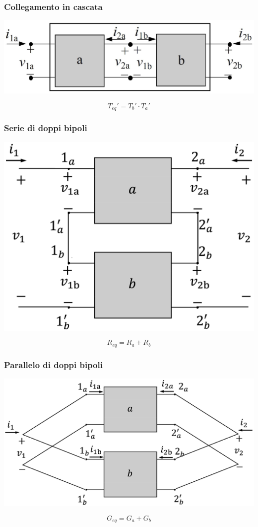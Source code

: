 \documentclass[a4paper]{article}
\begin{document}
\begin{multicols}{2}
	\subsubsection*{Collegamento in cascata}
	\begin{center}
		\includegraphics[width=0.8\linewidth]{immagini/dbp_cascata.png}
	\end{center}
	\[T_{eq}' = T_b' \cdot T_a'\]
	
	\subsubsection*{Serie di doppi bipoli}
	\begin{center}
		\includegraphics[width=0.7\linewidth]{immagini/dbp_serie.png}
	\end{center}
	\[R_{eq} = R_a + R_b\]
	
	\subsubsection*{Parallelo di doppi bipoli}
	\begin{center}
		\includegraphics[width=0.9\linewidth]{immagini/dbp_parallelo.png}
	\end{center}
	\[G_{eq} = G_a + G_b\]


\end{multicols}
\end{document}
